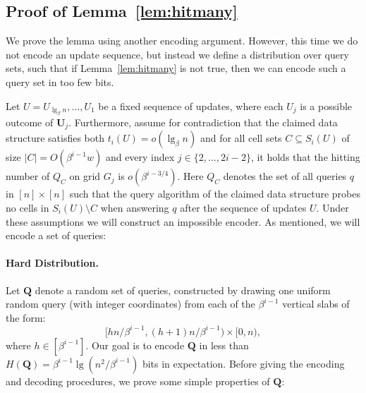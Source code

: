 \documentclass[letterpaper]{article}
\newcommand{\U}{\textbf{U}}
\newcommand{\Q}{\textbf{Q}}
\begin{document}
\subsection{Proof of Lemma~\ref{lem:hitmany}}
\label{sec:proofhitmany}
We prove the lemma using another encoding argument. However, this time
we do not encode an update sequence, but instead we define a
distribution over query sets, such that if Lemma~\ref{lem:hitmany} is
not true, then we can encode such a query set in too few bits.

Let $U=U_{\lg_\beta n},\dots,U_1$ be a fixed sequence of updates,
where each $U_j$ is a possible outcome of $\U_j$. Furthermore, assume
for contradiction that the claimed data structure satisfies both
$t_i(U) = o(\lg_\beta n)$ and for all cell sets $C \subseteq S_i(U)$
of size $|C|=O(\beta^{i-1}w)$ and every index $j \in \{2,\dots,2i-2
\}$, it holds that the hitting number of $Q_C$ on grid $G_j$ is
$o(\beta^{i-3/4})$. Here $Q_C$ denotes the set of all queries $q$ in
$[n]\times[n]$ such that the query algorithm of the claimed data
structure probes no cells in $S_i(U) \setminus C$ when answering $q$
after the sequence of updates $U$. Under these assumptions we will
construct an impossible encoder. As mentioned, we will encode a set of
queries:

\paragraph{Hard Distribution.}
Let $\Q$ denote a random set of queries, constructed by drawing one
uniform random query (with integer coordinates) from each of the
$\beta^{i-1}$ vertical slabs of the form:
$$[hn/\beta^{i-1},(h+1)n/\beta^{i-1}) \times [0,n),$$ where $h \in
    [\beta^{i-1}]$. Our goal is to encode $\Q$ in less than $H(\Q)
    =\beta^{i-1} \lg(n^2/\beta^{i-1})$ bits in expectation. Before
    giving the encoding and decoding procedures, we prove some simple
    properties of $\Q$:
\end{document}
